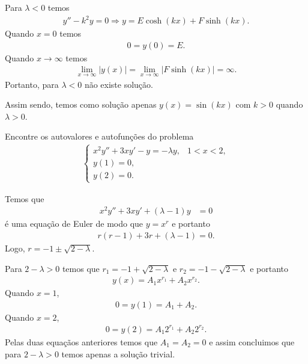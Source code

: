 \documentclass[a4paper,12pt, leqno, answers]{exam}
\begin{document}
\begin{questions}
\begin{parts}
\begin{solution}
            Para $\lambda < 0$ temos
            \begin{align*}
                y'' - k^2 y = 0 \Rightarrow y = E \cosh(k x) + F \sinh(k x).
            \end{align*}
            Quando $x = 0$ temos
            \begin{align*}
                0 = y(0) = E.
            \end{align*}
            Quando $x \to \infty$ temos
            \begin{align*}
                \lim_{x \to \infty} | y(x) | = \lim_{x \to \infty} | F \sinh(k x) | = \infty.
            \end{align*}
            Portanto, para $\lambda < 0$ n\~{a}o existe solu\c{c}\~{a}o.

            Assim sendo, temos como solu\c{c}\~{a}o apenas $y(x) = \sin(k x)$ com $k > 0$ quando $\lambda > 0$.
            
        \end{solution}
    \end{parts}

    \question Encontre os autovalores e autofun\c{c}\~{o}es do problema
    \begin{align*}
        \begin{cases}
            x^2 y'' + 3 x y' - y = - \lambda y, & 1 < x < 2, \\
            y(1) = 0, \\
            y(2) = 0.
        \end{cases}
    \end{align*}
    \begin{solution}
        Temos que
        \begin{align*}
            x^2 y'' + 3 x y' + (\lambda - 1) y &= 0
        \end{align*}
        \'{e} uma equa\c{c}\~{a}o de Euler de modo que $y = x^r$ e portanto
        \begin{align*}
            r (r - 1) + 3 r + (\lambda - 1) = 0.
        \end{align*}
        Logo, $r = -1 \pm \sqrt{2 - \lambda}$.

        Para $2 - \lambda > 0$ temos que $r_1 = - 1 + \sqrt{2 - \lambda}$ e $r_2 = -1 - \sqrt{2 - \lambda}$ e portanto
        \begin{align*}
            y(x) = A_1 x^{r_1} + A_2 x^{r_2}.
        \end{align*}
        Quando $x = 1$,
        \begin{align*}
            0 = y(1) = A_1 + A_2.
        \end{align*}
        Quando $x = 2$,
        \begin{align*}
            0 = y(2) = A_1 2^{r_1} + A_2 2^{r_2}.
        \end{align*}
        Pelas duas equa\c{c}\~{a}os anteriores temos que $A_1 = A_2 = 0$ e assim concluimos que para $2 - \lambda > 0$ temos apenas a solu\c{c}\~{a}o trivial.


\end{solution}
\end{questions}
\end{document}
